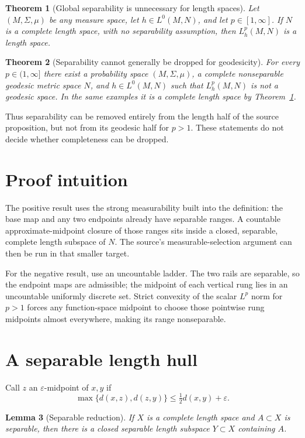 \documentclass[11pt]{article}
\newtheorem{theorem}{Theorem}
\newtheorem{lemma}[theorem]{Lemma}
\begin{document}
\begin{theorem}[Global separability is unnecessary for length spaces]
\label{th:length}
Let $(M,\Sigma,\mu)$ be any measure space, let $h\in L^0(M,N)$, and let
$p\in[1,\infty]$.  If $N$ is a complete length space, with no separability
assumption, then $L^p_h(M,N)$ is a length space.
\end{theorem}

\begin{theorem}[Separability cannot generally be dropped for geodesicity]
\label{th:counter}
For every $p\in(1,\infty]$ there exist a probability space
$(M,\Sigma,\mu)$, a complete nonseparable geodesic metric space $N$, and
$h\in L^0(M,N)$ such that $L^p_h(M,N)$ is not a geodesic space.
In the same examples it is a complete length space by
Theorem~\ref{th:length}.
\end{theorem}

Thus separability can be removed entirely from the length half of the source
proposition, but not from its geodesic half for $p>1$.  These statements do
not decide whether completeness can be dropped.

\section{Proof intuition}

The positive result uses the strong measurability built into the definition:
the base map and any two endpoints already have separable ranges.  A
countable approximate-midpoint closure of those ranges sits inside a closed,
separable, complete length subspace of $N$.  The source's measurable-selection
argument can then be run in that smaller target.

For the negative result, use an uncountable ladder.  The two rails are
separable, so the endpoint maps are admissible; the midpoint of each vertical
rung lies in an uncountable uniformly discrete set.  Strict convexity of the
scalar $L^p$ norm for $p>1$ forces any function-space midpoint to choose those
pointwise rung midpoints almost everywhere, making its range nonseparable.

\section{A separable length hull}

Call $z$ an $\varepsilon$-midpoint of $x,y$ if
\[
 \max\{d(x,z),d(z,y)\}\leq \tfrac12d(x,y)+\varepsilon.
\]

\begin{lemma}[Separable reduction]
\label{lem:hull}
If $X$ is a complete length space and $A\subset X$ is separable, then there
is a closed separable length subspace $Y\subset X$ containing $A$.
\end{lemma}
\end{document}
